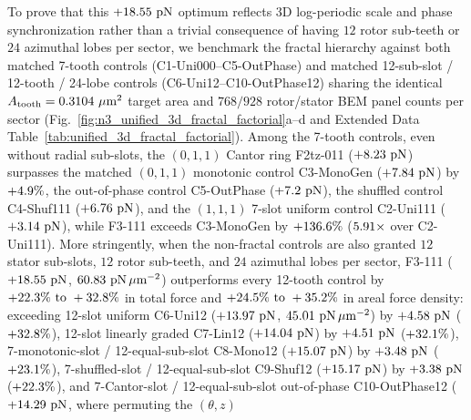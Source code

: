 \documentclass[pdflatex,sn-nature]{sn-jnl}
\DeclareRobustCommand{\roundone}[1]{\fpeval{round(#1,1)}}
\DeclareRobustCommand{\roundtwo}[1]{\fpeval{round(#1,2)}}
\begin{document}
To prove that this $+\roundtwo{\NthreeUnithreedFoneoneoneUnifiedFzPn}\text{ pN}$ optimum reflects 3D log-periodic scale and phase synchronization rather than a trivial consequence of having $12$ rotor sub-teeth or $24$ azimuthal lobes per sector, we benchmark the fractal hierarchy against both matched 7-tooth controls (C1-Uni000--C5-OutPhase) and matched 12-sub-slot / 12-tooth / 24-lobe controls (C6-Uni12--C10-OutPhase12) sharing the identical $A_{\rm tooth} = 0.3104\ \mu\text{m}^2$ target area and $768/928$ rotor/stator BEM panel counts per sector (Fig.~\ref{fig:n3_unified_3d_fractal_factorial}a--d and Extended Data Table~\ref{tab:unified_3d_fractal_factorial}). Among the 7-tooth controls, even without radial sub-slots, the $(0,1,1)$ Cantor ring F2tz-011 ($+\roundtwo{\NthreeUnithreedFzerooneoneThetazFzPn}\text{ pN}$) surpasses the matched $(0,1,1)$ monotonic control C3-MonoGen ($+\roundtwo{\NthreeUnithreedCtrlMonogenFzPn}\text{ pN}$) by $+\roundone{\NthreeUnithreedGainFzerooneoneVsMonogenPct}\%$, the out-of-phase control C5-OutPhase ($+\roundtwo{\NthreeUnithreedCtrlOutphaseFzPn}\text{ pN}$), the shuffled control C4-Shuf111 ($+\roundtwo{\NthreeUnithreedCtrlShuffledoneoneoneFzPn}\text{ pN}$), and the $(1,1,1)$ 7-slot uniform control C2-Uni111 ($+\roundtwo{\NthreeUnithreedCtrlUnioneoneoneFzPn}\text{ pN}$), while F3-111 exceeds C3-MonoGen by $+\roundone{\NthreeUnithreedGainFoneoneoneVsMonogenPct}\%$ ($\roundtwo{\NthreeUnithreedRatioFoneoneoneVsUnioneoneone}\times$ over C2-Uni111). More stringently, when the non-fractal controls are also granted $12$ stator sub-slots, $12$ rotor sub-teeth, and $24$ azimuthal lobes per sector, F3-111 ($+\roundtwo{\NthreeUnithreedFoneoneoneUnifiedFzPn}\text{ pN}$, $\roundtwo{\NthreeUnithreedFoneoneoneUnifiedFa}\text{ pN}\,\mu\text{m}^{-2}$) outperforms every 12-tooth control by $+\roundone{\NthreeUnithreedGainFoneoneoneVsShufonetwoPct}\%\text{ to }+\roundone{\NthreeUnithreedGainFoneoneoneVsUnionetwoPct}\%$ in total force and $+\roundone{\NthreeUnithreedGainFoneoneoneVsShufonetwoFaPct}\%\text{ to }+\roundone{\NthreeUnithreedGainFoneoneoneVsUnionetwoFaPct}\%$ in areal force density: exceeding 12-slot uniform C6-Uni12 ($+\roundtwo{\NthreeUnithreedCtrlUnionetwoFzPn}\text{ pN}$, $\roundtwo{\NthreeUnithreedCtrlUnionetwoFa}\text{ pN}\,\mu\text{m}^{-2}$) by $+\roundtwo{\NthreeUnithreedGainFoneoneoneVsUnionetwoPn}\text{ pN}$ ($+\roundone{\NthreeUnithreedGainFoneoneoneVsUnionetwoPct}\%$), 12-slot linearly graded C7-Lin12 ($+\roundtwo{\NthreeUnithreedCtrlLinonetwoFzPn}\text{ pN}$) by $+\roundtwo{\NthreeUnithreedGainFoneoneoneVsLinonetwoPn}\text{ pN}$ ($+\roundone{\NthreeUnithreedGainFoneoneoneVsLinonetwoPct}\%$), 7-monotonic-slot / 12-equal-sub-slot C8-Mono12 ($+\roundtwo{\NthreeUnithreedCtrlMonoonetwoFzPn}\text{ pN}$) by $+\roundtwo{\NthreeUnithreedGainFoneoneoneVsMonoonetwoPn}\text{ pN}$ ($+\roundone{\NthreeUnithreedGainFoneoneoneVsMonoonetwoPct}\%$), 7-shuffled-slot / 12-equal-sub-slot C9-Shuf12 ($+\roundtwo{\NthreeUnithreedCtrlShufonetwoFzPn}\text{ pN}$) by $+\roundtwo{\NthreeUnithreedGainFoneoneoneVsShufonetwoPn}\text{ pN}$ ($+\roundone{\NthreeUnithreedGainFoneoneoneVsShufonetwoPct}\%$), and 7-Cantor-slot / 12-equal-sub-slot out-of-phase C10-OutPhase12 ($+\roundtwo{\NthreeUnithreedCtrlOutphaseonetwoFzPn}\text{ pN}$, where permuting the $(\theta,z)$ 
\end{document}
